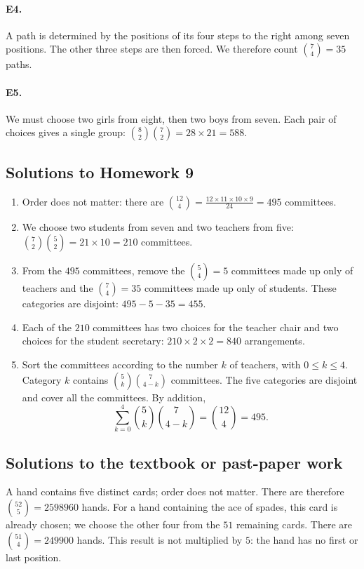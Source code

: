 \paragraph{E4.}A path is determined by the positions of its four steps to the right among seven positions. The other three steps are then forced. We therefore count $\binom74=35$ paths.

\paragraph{E5.}We must choose two girls from eight, then two boys from seven. Each pair of choices gives a single group: $\binom82\binom72=28\times21=588$.


\subsection{Solutions to Homework 9}\begin{enumerate}
\item Order does not matter: there are $\binom{12}{4}=\frac{12\times11\times10\times9}{24}=495$ committees.
\item We choose two students from seven and two teachers from five: $\binom72\binom52=21\times10=210$ committees.
\item From the $495$ committees, remove the $\binom54=5$ committees made up only of teachers and the $\binom74=35$ committees made up only of students. These categories are disjoint: $495-5-35=455$.
\item Each of the $210$ committees has two choices for the teacher chair and two choices for the student secretary: $210\times2\times2=840$ arrangements.
\item Sort the committees according to the number $k$ of teachers, with $0\le k\le4$. Category $k$ contains $\binom5k\binom7{4-k}$ committees. The five categories are disjoint and cover all the committees. By addition,
\[\sum_{k=0}^4\binom5k\binom7{4-k}=\binom{12}4=495.\]
\end{enumerate}

\subsection{Solutions to the textbook or past-paper work}A hand contains five distinct cards; order does not matter. There are therefore $\binom{52}5=\num{2598960}$ hands. For a hand containing the ace of spades, this card is already chosen; we choose the other four from the $51$ remaining cards. There are $\binom{51}4=\num{249900}$ hands. This result is not multiplied by $5$: the hand has no first or last position.

\fi

